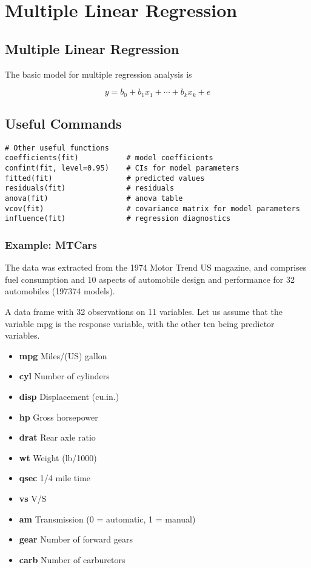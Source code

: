 
\chapter{Multiple Linear Regression}
\section{Multiple Linear Regression}
The basic model for multiple regression analysis is

\[
y = b_0 + b_1x_1 + \cdots  + b_kx_k + e
\]

\section{Useful Commands}
\begin{verbatim}
# Other useful functions
coefficients(fit)           # model coefficients
confint(fit, level=0.95)    # CIs for model parameters
fitted(fit)                 # predicted values
residuals(fit)              # residuals
anova(fit)                  # anova table
vcov(fit)                   # covariance matrix for model parameters
influence(fit)              # regression diagnostics
\end{verbatim}

\subsection{Example: MTCars}
The data was extracted from the 1974 Motor Trend US magazine, and comprises fuel consumption and 10 aspects of automobile design and performance for 32 automobiles (197374 models).

A data frame with 32 observations on 11 variables. Let
us assume that the variable mpg is the response variable, with the other ten being predictor variables.

\begin{itemize}
\item  \textbf{mpg}  Miles/(US) gallon
\item  \textbf{cyl}  Number of cylinders
\item  \textbf{disp}  Displacement (cu.in.)
\item  \textbf{hp}  Gross horsepower
\item  \textbf{drat}  Rear axle ratio
\item  \textbf{wt}  Weight (lb/1000)
\item  \textbf{qsec}  1/4 mile time
\item  \textbf{vs}  V/S
\item  \textbf{am}  Transmission (0 = automatic, 1 = manual)
\item  \textbf{gear}  Number of forward gears
\item  \textbf{carb}  Number of carburetors
\end{itemize}

